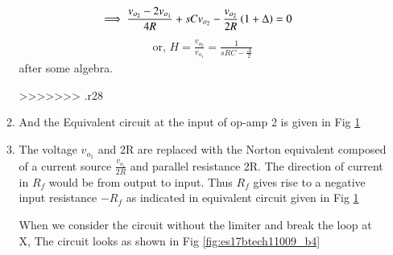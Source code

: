 \begin{enumerate}[label=\arabic*.,ref=\theenumi]
\begin{enumerate}[label=\arabic*.,ref=\theenumi]
\begin{align}
\implies \frac{v_{o_2} - 2v_{o_1}}{4R} + sCv_{o_2} -  \frac{v_{o_2}}{2R}\left(1 + \Delta\right) &= 0
\end{align}
\begin{align}
\text{or, }    H = \frac{v_{o_2}}{v_{o_1}}= \frac{1}{sRC - \frac{\Delta}{2}}
    \label{eq:es17btech11009_H}
\end{align}
after some algebra.
%

>>>>>>> .r28
\item
And the Equivalent circuit at the input of op-amp 2 is given in Fig \ref{fig:es17btech11009_fig2}
\renewcommand{\thefigure}{\theenumi.\arabic{figure}}
\begin{figure}[!ht]
	\begin{center}
		\resizebox{\columnwidth}{!}{}
	\end{center}
\caption{}
\label{fig:es17btech11009_fig2}
\end{figure}
\item 
\solution The voltage $v_{o_1}$ and 2R are replaced with the Norton equivalent composed of a current source $\frac{v_{o_1}}{2R}$ and parallel resistance 2R. The direction of current in $R_{f}$ would be from output to input. Thus $R_{f}$ gives rise to a negative input resistance $-R_{f}$ as indicated in equivalent circuit given in Fig \ref{fig:es17btech11009_fig2}

When we consider the circuit without the limiter and break the loop at X, The circuit looks as shown in Fig \ref{fig:es17btech11009_b4}
\renewcommand{\thefigure}{\theenumi.\arabic{figure}}


\end{enumerate}
\end{enumerate}
